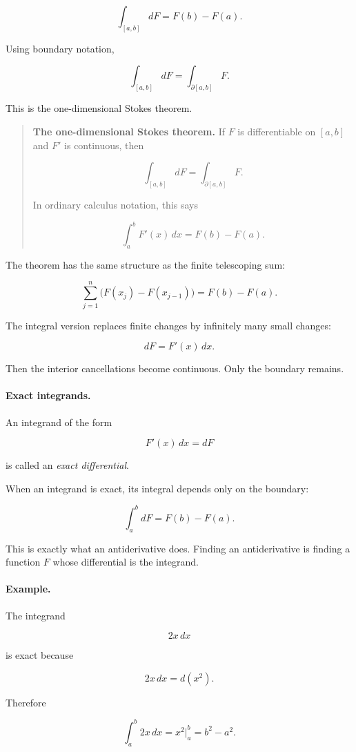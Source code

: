 \[
\boxed{
\int_{[a,b]} dF=F(b)-F(a).
}
\]

Using boundary notation,

\[
\boxed{
\int_{[a,b]} dF=\int_{\partial[a,b]} F.
}
\]

This is the one-dimensional Stokes theorem.

\begin{quote}
\textbf{The one-dimensional Stokes theorem.}
If \(F\) is differentiable on \([a,b]\) and \(F'\) is continuous, then

\[
\boxed{
\int_{[a,b]} dF=\int_{\partial[a,b]} F.
}
\]

In ordinary calculus notation, this says

\[
\boxed{
\int_a^b F'(x)\,dx=F(b)-F(a).
}
\]
\end{quote}

The theorem has the same structure as the finite telescoping sum:

\[
\sum_{j=1}^{n}\bigl(F(x_j)-F(x_{j-1})\bigr)=F(b)-F(a).
\]

The integral version replaces finite changes by infinitely many small changes:

\[
dF=F'(x)\,dx.
\]

Then the interior cancellations become continuous.  Only the boundary remains.

\paragraph{Exact integrands.}
An integrand of the form

\[
F'(x)\,dx=dF
\]

is called an \emph{exact differential}.

When an integrand is exact, its integral depends only on the boundary:

\[
\int_a^b dF=F(b)-F(a).
\]

This is exactly what an antiderivative does.  Finding an antiderivative is finding a
function \(F\) whose differential is the integrand.

\paragraph{Example.}
The integrand

\[
2x\,dx
\]

is exact because

\[
2x\,dx=d(x^2).
\]

Therefore

\[
\int_a^b 2x\,dx
=
x^2\Big|_a^b
=
b^2-a^2.
\]

